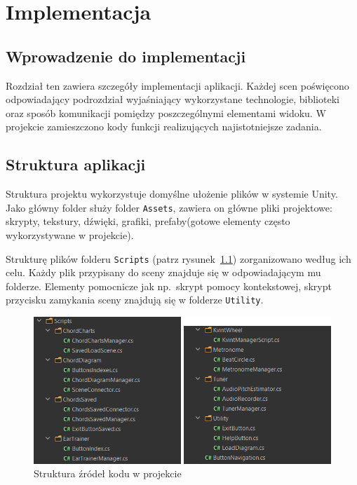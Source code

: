 \chapter{Implementacja}

\section{Wprowadzenie do implementacji}


Rozdział ten zawiera szczegóły implementacji aplikacji. Każdej scen poświęcono odpowiadający podrozdział wyjaśniający wykorzystane technologie, biblioteki oraz sposób komunikacji pomiędzy poszczególnymi elementami widoku. W projekcie zamieszczono kody funkcji realizujących najistotniejsze zadania.

\section{Struktura aplikacji}
Struktura projektu wykorzystuje domyślne ułożenie plików w systemie Unity. Jako główny folder służy folder \texttt{Assets}, zawiera on główne pliki projektowe: skrypty, tekstury, dźwięki, grafiki, prefaby(gotowe elementy często wykorzystywane w projekcie).

Strukturę plików folderu \texttt{Scripts} (patrz rysunek~\ref{fig:strukturaKodu}) zorganizowano według ich celu. Każdy plik przypisany do sceny znajduje się w odpowiadającym mu folderze. Elementy pomocnicze jak np.\ skrypt pomocy kontekstowej, skrypt przycisku zamykania sceny znajdują się w folderze \texttt{Utility}. 
 \begin{figure}[htb]
     \centering
 	\includegraphics[scale=.8]{rys04/StrukturaPlikow}
	\caption{Struktura źródeł kodu w projekcie}
	\label{fig:strukturaKodu}
 \end{figure}

